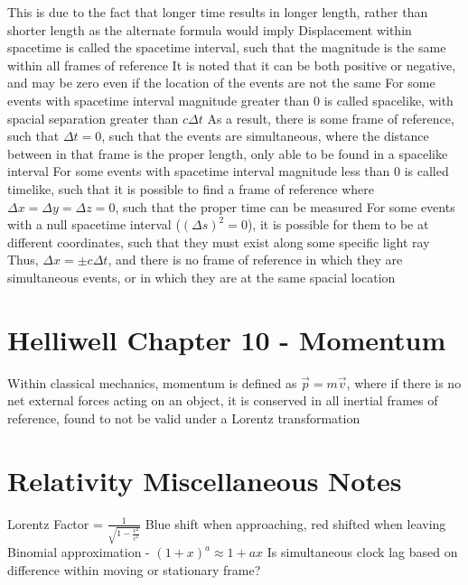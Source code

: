 \documentclass[11 pt, twoside]{article}
\newenvironment{outline*}
{
	\begin{outline}[enumerate]
	}
	{\end{outline}
}
\begin{document}
\begin{outline*}
\3 This is due to the fact that longer time results in longer length, rather than shorter length as the alternate formula would imply
\2 Displacement within spacetime is called the spacetime interval, such that the magnitude is the same within all frames of reference
\3 It is noted that it can be both positive or negative, and may be zero even if the location of the events are not the same
\3 For some events with spacetime interval magnitude greater than 0 is called spacelike, with spacial separation greater than $c\Delta t$
\4 As a result, there is some frame of reference, such that $\Delta t = 0$, such that the events are simultaneous, where the distance between in that frame is the proper length, only able to be found in a spacelike interval
\3 For some events with spacetime interval magnitude less than 0 is called timelike, such that it is possible to find a frame of reference where $\Delta x = \Delta y = \Delta z = 0$, such that the proper time can be measured
\3 For some events with a null spacetime interval ($(\Delta s)^2 = 0$), it is possible for them to be at different coordinates, such that they must exist along some specific light ray
\4 Thus, $\Delta x = \pm c\Delta t$, and there is no frame of reference in which they are simultaneous events, or in which they are at the same spacial location
\end{outline*}
\section{Helliwell Chapter 10 - Momentum}
\begin{outline*}
\1 Within classical mechanics, momentum is defined as $\vec{p} = m\vec{v}$, where if there is no net external forces acting on an object, it is conserved in all inertial frames of reference, found to not be valid under a Lorentz transformation
\1 
\end{outline*}
\section{Relativity Miscellaneous Notes}
Lorentz Factor = $\frac{1}{\sqrt{1 - \frac{v^2}{c^2}}}$
Blue shift when approaching, red shifted when leaving
Binomial approximation - $(1 + x)^a \approx 1 + ax$
Is simultaneous clock lag based on difference within moving or stationary frame?
\end{document}
